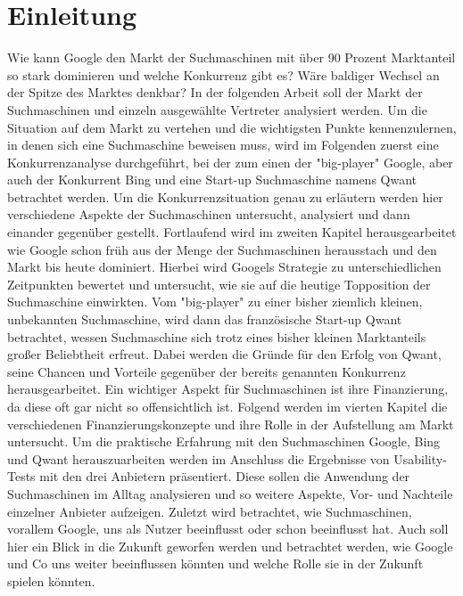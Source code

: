 \documentclass[11pt]{article}
\begin{document}
\chapter{Einleitung}\label{ch:einleitung}
Wie kann Google den Markt der Suchmaschinen mit über 90 Prozent Marktanteil so stark dominieren und welche Konkurrenz gibt es?
Wäre baldiger Wechsel an der Spitze des Marktes denkbar?
In der folgenden Arbeit soll der Markt der Suchmaschinen und einzeln ausgewählte Vertreter analysiert werden.
    Um die Situation auf dem Markt zu vertehen und die wichtigsten Punkte kennenzulernen, in denen sich eine Suchmaschine beweisen muss,
wird im Folgenden zuerst eine Konkurrenzanalyse durchgeführt, bei der zum einen der "big-player" Google,
aber auch der Konkurrent Bing und eine Start-up Suchmaschine namens Qwant betrachtet werden.
Um die Konkurrenzsituation genau zu erläutern werden hier verschiedene Aspekte der Suchmaschinen untersucht, analysiert und dann einander gegenüber gestellt.
    Fortlaufend wird im zweiten Kapitel herausgearbeitet wie Google schon früh aus der Menge der Suchmaschinen herausstach und den Markt bis heute dominiert.
    Hierbei wird Googels Strategie zu unterschiedlichen Zeitpunkten bewertet und untersucht, wie sie auf die heutige Topposition der Suchmaschine einwirkten.
    Vom "big-player" zu einer bisher ziemlich kleinen, unbekannten Suchmaschine,
wird dann das französische Start-up Qwant betrachtet, wessen Suchmaschine sich trotz eines bisher kleinen Marktanteils großer Beliebtheit erfreut.
    Dabei werden die Gründe für den Erfolg von Qwant, seine Chancen und Vorteile gegenüber der bereits genannten Konkurrenz herausgearbeitet.
    Ein wichtiger Aspekt für Suchmaschinen ist ihre Finanzierung, da diese oft gar nicht so offensichtlich ist.
Folgend werden im vierten Kapitel die verschiedenen Finanzierungskonzepte und ihre Rolle in der Aufstellung am Markt untersucht.
    Um die praktische Erfahrung mit den Suchmaschinen Google, Bing und Qwant herauszuarbeiten werden im Anschluss die Ergebnisse von Usability-Tests mit den drei Anbietern präsentiert.
    Diese sollen die Anwendung der Suchmaschinen im Alltag analysieren und so weitere Aspekte, Vor- und Nachteile einzelner Anbieter aufzeigen.
    Zuletzt wird betrachtet, wie Suchmaschinen, vorallem Google, uns als Nutzer beeinflusst oder schon beeinflusst hat.
Auch soll hier ein Blick in die Zukunft geworfen werden und betrachtet werden, wie Google und Co uns weiter beeinflussen könnten und welche Rolle sie in der Zukunft spielen könnten.
\end{document}

